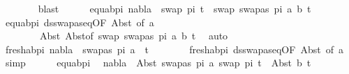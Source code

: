 \begin{isabellebody}
\ \ \ \ \ \ \isamarkupfalse%
\ blast{\isacharplus}{\kern0pt}\isanewline
\ \ \ \ \isamarkupfalse%
\ equ{\isacharunderscore}{\kern0pt}ab{\isacharunderscore}{\kern0pt}pi{}{\isacharcolon}{\kern0pt}\ {\isachardoublequoteopen}nabla\ {\isasymturnstile}\ swap\ pi{}\ t{}{\isacharprime}{\kern0pt}\ {\isasymapprox}\ swap\ {\isacharbrackleft}{\kern0pt}{\isacharparenleft}{\kern0pt}swapas\ pi{}\ a{\isacharcomma}{\kern0pt}\ b{\isacharparenright}{\kern0pt}{\isacharbrackright}{\kern0pt}\ t{}{\isacharprime}{\kern0pt}{\isachardoublequoteclose}\isanewline
\ \ \ \ \ \ \isamarkupfalse%
\ equ{\isacharunderscore}{\kern0pt}ab{\isacharunderscore}{\kern0pt}pi{}\ ds{\isacharunderscore}{\kern0pt}swapas{\isacharunderscore}{\kern0pt}eq{\isacharbrackleft}{\kern0pt}OF\ Abst{\isacharparenleft}{\kern0pt}{}{\isacharparenright}{\kern0pt}{\isacharcomma}{\kern0pt}\ of\ a{\isacharbrackright}{\kern0pt}\ \isanewline
\ \ \ \ \ \ \ \ Abst{\isacharparenleft}{\kern0pt}{}{\isacharparenright}{\kern0pt}\ Abst{\isacharparenleft}{\kern0pt}{}{\isacharparenright}{\kern0pt}{\isacharbrackleft}{\kern0pt}of\ {\isacartoucheopen}swap\ {\isacharbrackleft}{\kern0pt}{\isacharparenleft}{\kern0pt}swapas\ pi{}\ a{\isacharcomma}{\kern0pt}\ b{\isacharparenright}{\kern0pt}{\isacharbrackright}{\kern0pt}\ t{}{\isacharprime}{\kern0pt}{\isacartoucheclose}{\isacharbrackright}{\kern0pt}\ \isamarkupfalse%
\ auto\isanewline
\ \ \ \ \isamarkupfalse%
\ fresh{\isacharunderscore}{\kern0pt}ab{\isacharunderscore}{\kern0pt}pi{}{\isacharcolon}{\kern0pt}\ {\isachardoublequoteopen}nabla\ {\isasymturnstile}\ swapas\ pi{}\ a\ {\isasymsharp}\ t{}{\isacharprime}{\kern0pt}{\isachardoublequoteclose}\isanewline
\ \ \ \ \ \ \isamarkupfalse%
\ fresh{\isacharunderscore}{\kern0pt}ab{\isacharunderscore}{\kern0pt}pi{}\ ds{\isacharunderscore}{\kern0pt}swapas{\isacharunderscore}{\kern0pt}eq{\isacharbrackleft}{\kern0pt}OF\ Abst{\isacharparenleft}{\kern0pt}{}{\isacharparenright}{\kern0pt}{\isacharcomma}{\kern0pt}\ of\ a{\isacharbrackright}{\kern0pt}\ \isamarkupfalse%
\ simp\isanewline
\ \ \ \ \isamarkupfalse%
\ equ{\isacharunderscore}{\kern0pt}ab{\isacharunderscore}{\kern0pt}pi{}\ \isamarkupfalse%
\ {\isachardoublequoteopen}nabla\ {\isasymturnstile}\ Abst\ {\isacharparenleft}{\kern0pt}swapas\ pi{}\ a{\isacharparenright}{\kern0pt}\ {\isacharparenleft}{\kern0pt}swap\ pi{}\ t{}{\isacharprime}{\kern0pt}{\isacharparenright}{\kern0pt}\ {\isasymapprox}\ Abst\ b\ t{}{\isacharprime}{\kern0pt}{\isachardoublequoteclose}\isanewline

\end{isabellebody}
